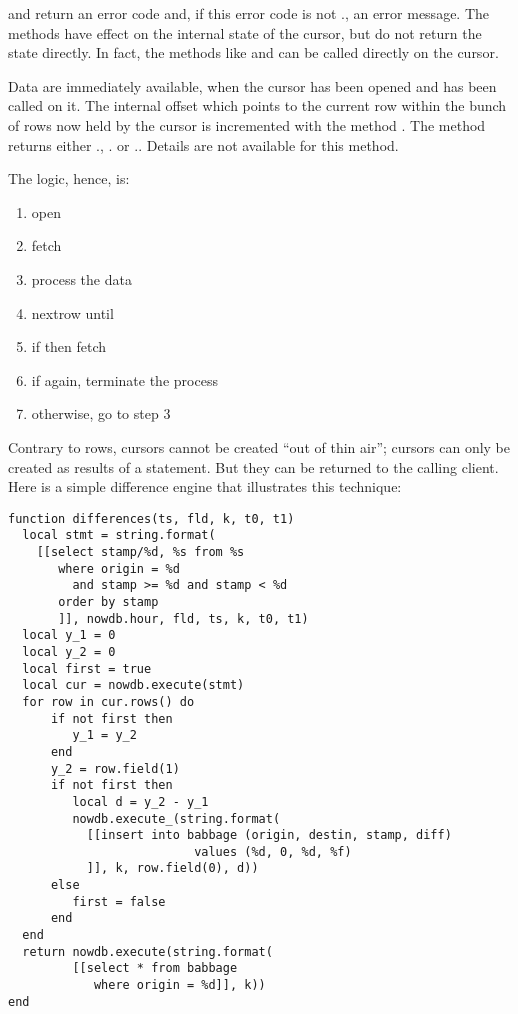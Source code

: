 and  return an error code
and, if this error code is not .,
an error message. The methods have effect on
the internal state of the cursor, but do not return
the state directly. In fact, the  methods
like  and  can be called
directly on the cursor.

Data are immediately available,
when the cursor has been opened and 
has been called on it.
The internal offset which points to the current row
within the bunch of rows now held by the cursor is
incremented with the method .
The method returns either
.,
.
or ..
Details are not available for this method.

\begin{minipage}{\textwidth}
The logic, hence, is:
\begin{enumerate}
\item open
\item fetch
\item process the data
\item nextrow until 
\item if  then fetch
\item if  again, terminate the process
\item otherwise, go to step 3 
\end{enumerate}
\end{minipage}

\clearpage
Contrary to rows, cursors cannot be created
``out of thin air''; cursors can only be created
as results of a  statement.
But they can be returned to the calling client.
Here is a simple difference engine that
illustrates this technique:

\begin{lua}
\begin{lstlisting}
function differences(ts, fld, k, t0, t1)
  local stmt = string.format(
    [[select stamp/%d, %s from %s
       where origin = %d
         and stamp >= %d and stamp < %d
       order by stamp
       ]], nowdb.hour, fld, ts, k, t0, t1)
  local y_1 = 0
  local y_2 = 0
  local first = true
  local cur = nowdb.execute(stmt)
  for row in cur.rows() do
      if not first then
         y_1 = y_2
      end
      y_2 = row.field(1)
      if not first then
         local d = y_2 - y_1
         nowdb.execute_(string.format(
           [[insert into babbage (origin, destin, stamp, diff)
                          values (%d, 0, %d, %f)
           ]], k, row.field(0), d))
      else
         first = false
      end
  end
  return nowdb.execute(string.format(
         [[select * from babbage
            where origin = %d]], k))
end
\end{lstlisting}
\end{lua}


